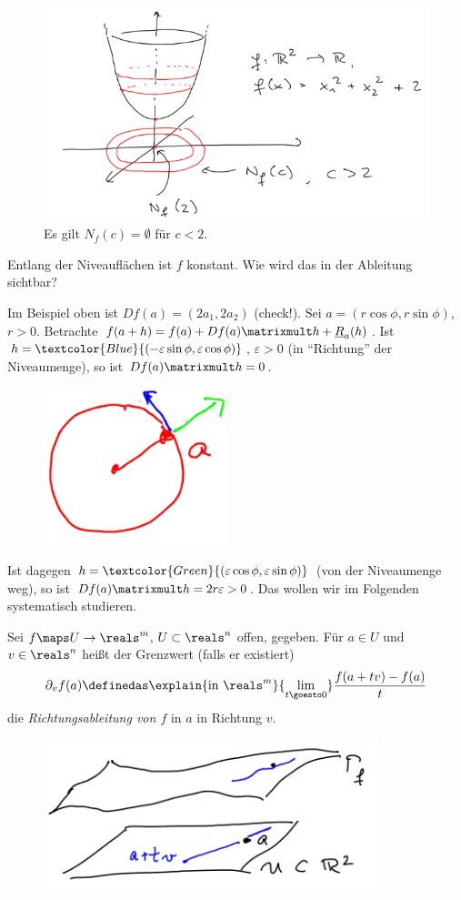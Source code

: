 \begin{beispiel*}
    \begin{figure}[H]
        \centering
        \includegraphics[width=0.5\linewidth]{figures/niveau_menge_beispiel}
        \caption*{Es gilt \( N_f(c)=\emptyset \) für \( c<2 \).}
        \label{fig:niveau_menge_beispiel}
    \end{figure}
    Entlang der Niveauflächen ist \( f \) konstant. Wie wird das in der Ableitung sichtbar?

    Im Beispiel oben ist \( Df(a)=(2a_1,2a_2) \) (check!). Sei \( a=(r\cos \phi, r\sin \phi) \), \( r>0 \). Betrachte \( f(a+h)=f(a)+Df(a)\matrixmult h+\underline{R}_a(h) \). Ist \( h=\textcolor{Blue}{(-\varepsilon \sin \phi, \varepsilon \cos \phi)} \), \( \varepsilon>0 \) (in \enquote{Richtung} der Niveaumenge), so ist \( Df(a)\matrixmult h=0 \).
    \begin{figure}[H]
        \centering
        \includegraphics[width=0.2\linewidth]{figures/in_richtung_und_orthogonal_der_niveaumenge}
        \label{fig:in_richtung_und_orthogonal_der_niveaumenge}
    \end{figure}
    Ist dagegen \( h=\textcolor{Green}{(\varepsilon \cos \phi, \varepsilon \sin \phi)} \) (von der Niveaumenge weg), so ist \( Df(a)\matrixmult h=2r\varepsilon>0 \). Das wollen wir im Folgenden systematisch studieren.
\end{beispiel*}
\begin{definition*}
    Sei \( f\maps U\to \reals^m \), \( U\subset \reals^n \) offen, gegeben. Für \( a\in U \) und \( v\in \reals^n \) heißt der Grenzwert (falls er existiert)
    \begin{align*}
        \partial_v f(a)\definedas \explain{\text{in \( \reals^m \)}}{\lim_{t \goesto 0}}\frac{f(a+tv)-f(a)}{t}
    \end{align*}
    die \emph{Richtungsableitung von \( f \)} in \( a \) in Richtung \( v \).
    \begin{figure}[H]
        \centering
        \includegraphics[width=0.5\linewidth]{figures/richtungsableitung}
        \label{fig:richtungsableitung}
    \end{figure}
\end{definition*}
